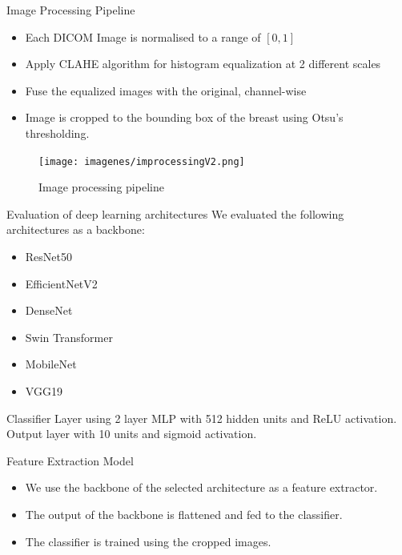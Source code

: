 \begin{frame}{Image Processing Pipeline}
    \begin{itemize}
        \item Each DICOM Image is normalised to a range of $[0, 1]$
        \item Apply CLAHE algorithm  for histogram equalization at 2 different scales
        \item Fuse the equalized images with the original, channel-wise
        \item Image is cropped to the bounding box of the breast using Otsu's thresholding.
    \end{itemize}
\end{frame}

\begin{frame}[plain]
    \begin{figure}
        \centering
        \texttt{[image: imagenes/improcessingV2.png]}
        \caption{Image processing pipeline}
    \end{figure}
\end{frame}
\begin{frame}{Evaluation of deep learning architectures}
    We evaluated the following architectures as a backbone:
    \begin{itemize}
        \item ResNet50
        \item EfficientNetV2
        \item DenseNet
        \item Swin Transformer
        \item MobileNet
        \item VGG19
    \end{itemize}

    Classifier Layer using 2 layer MLP with 512 hidden units and ReLU activation.
    Output layer with 10 units and sigmoid activation.
\end{frame}

\begin{frame}{Feature Extraction Model}
    \begin{itemize}
        \item We use the backbone of the selected architecture as a feature extractor.
        \item The output of the backbone is flattened and fed to the classifier.
        \item The classifier is trained using the cropped images.
    \end{itemize}
\end{frame}






